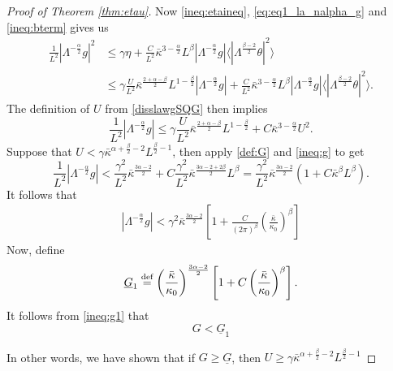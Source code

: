 \documentclass[twoside, reqno]{amsart}
\numberwithin{lemma}{section}
\numberwithin{theorem}{section}
\numberwithin{proposition}{section}
\numberwithin{equation}{section} %
\newcommand{\te}{\theta}
\newcommand{\ga}{\gamma}
\newcommand{\la}{\Lambda}
\newcommand{\ka}{\kappa}
\newcommand{\bkap}{\bar{\kap}}
\newcommand{\Gb}{\underline{G}}
\newcommand{\al}{\alpha}
\newcommand{\be}{\beta}
\newcommand{\gam}{\gamma}
\newcommand{\kap}{\kappa}
\begin{document}
\begin{proof}[Proof of Theorem \ref{thm:etau}]
  
 Now \eqref{ineq:etaineq}, \eqref{eq:eq1_la_nalpha_g} and \eqref{ineq:bterm} gives us
    \begin{equation*} 
    \begin{split}
    \frac{1}{L^2} |\la^{-\frac{\alpha}{2}} g|^2 
    & \le \ga \eta + \frac{C}{L^2} \bar{\ka}^{3-\frac{\alpha}{2}}{L^{\beta}} |\la^{-\frac{\alpha}{2}}g| \langle |\la^{\frac{\beta-2}{2}}\te|^2 \rangle 
    \\
    & \le \ga \frac{U}{L^2}\bar{\ka}^{\frac{2+\alpha-\beta}{2}} {L^{1-\frac{\beta}2}} |\la^{-\frac{\alpha}{2}}g| + \frac{C}{L^2} \bar{\ka}^{3-\frac{\alpha}{2}}{L^{\beta}} |\la^{-\frac{\alpha}{2}}g| \langle |\la^{\frac{\beta-2}{2}}\te|^2 \rangle .
    \end{split} 
    \end{equation*}
{The definition of $U$ from \eqref{disslawgSQG} then implies}
    \begin{equation} \label{ineq:g}
        \frac{1}{L^2} |\la^{-\frac{\alpha}{2}} g| \le \ga \frac{U}{L^2}\bar{\ka}^{\frac{2+\alpha-\beta}{2}}{L^{1-\frac{\beta}2}} + C \bar{\ka}^{3-\frac{\alpha}{2}} U^2.
    \end{equation}
Suppose that $U < \ga \bar{\ka}^{\alpha+\frac{\beta}{2}-2} {L^{\frac{\beta}2-1}}$, then apply \eqref{def:G} and \eqref{ineq:g} to get
    \begin{equation*}
     \frac{1}{L^2} |\la^{-\frac{\alpha}{2}} g|  <  \frac{\ga^2}{L^2}\bar{\ka}^{\frac{3\alpha-2}{2}} + C{\frac{\gam^2}{L^2}\bkap^{\frac{3\al-2+2\be}2}L^\be=\frac{\gam^2}{L^2}\bkap^{\frac{3\al-2}{2}}\left(1+C\bkap^\be L^\be\right)}.
    \end{equation*}
{It follows that}
    \begin{align}\label{ineq:g1}
  |\la^{-\frac{\alpha}{2}} g| < \ga^2 \bkap^{\frac{3\al-2}{2}}\left[1 + {\frac{C}{(2\pi)^\be}}\left(\frac{\bar{\ka}}{\kap_0}\right)^{\beta}\right]
    \end{align}
{Now, define}
    \begin{align}\notag
        \Gb_1\overset{\text{def}}{=}\left(\frac{\bar{\ka}}{\kap_0}\right)^{\frac{3\alpha-2}{2}}\left[1 + C\left(\frac{\bar{\ka}}{\kap_0}\right)^{\beta}\right].
    \end{align}
{It follows from \eqref{ineq:g1} that}
   \begin{equation*}
    G  < \Gb_1
    \end{equation*}            
{In other words, we have shown that if $G \ge \underline{G}$, then $U \ge \ga \bar{\ka}^{\alpha+\frac{\beta}{2}-2} L^{\frac{\beta}2-1}$

}
\end{proof}
\end{document}
